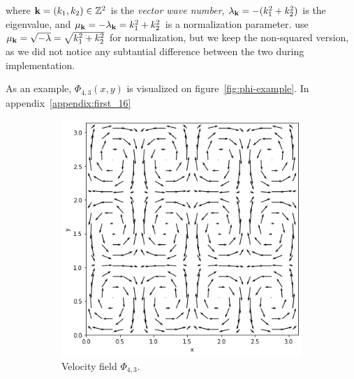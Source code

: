 where $\vb{k} = (k_1, k_2) \in \mathbb{Z}^2$ is the \textit{vector wave number},
$\lambda_{\vb{k}} = -(k_1^2 + k_2^2)$ is the eigenvalue, and $\mu_{\vb{k}}
= -\lambda_{\vb{k}} = k_1^2 + k_2^2$ is a normalization parameter.
\cite{scalable-eigenfluids} use $\mu_{\vb{k}} = \sqrt{-\lambda} = \sqrt{k_1^2
+ k_2^2}$ for normalization, but we keep the non-squared version, as we did not
notice any subtantial difference between the two during implementation.

As an example, $\Phi_{4,3}(x,y)$ is visualized on figure~\ref{fig:phi-example}.
In appendix~\ref{appendix:first_16}

\begin{figure}
  \centering
  \begin{subfigure}[t]{0.48\textwidth}
    \centering
    \includegraphics[height=\textwidth]{figures/eigenfluids/k_4_3_vel.png}
    \caption{Velocity field $\Phi_{4,3}$.}
  \end{subfigure}
  \begin{subfigure}[t]{0.48\textwidth}
    \centering

\end{subfigure}
\end{figure}
